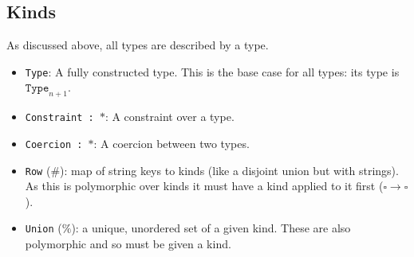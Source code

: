 \subsection{Kinds}
As discussed above, all types are described by a type.

\begin{itemize}
\item \texttt{Type}: A fully constructed type. This is the base case for all types: its type is $\mathtt{Type}_{n+1}$.
\item \texttt{Constraint : $*$}: A constraint over a type.
\item \texttt{Coercion : $*$}: A coercion between two types.
\item \texttt{Row} ($\#$): map of string keys to kinds (like a disjoint union but with strings). As this is polymorphic over kinds it must have a kind applied to it first ($\square \to \square$).
\item \texttt{Union} ($\%$): a unique, unordered set of a given kind. These are also polymorphic and so must be given a kind.
\end{itemize}
